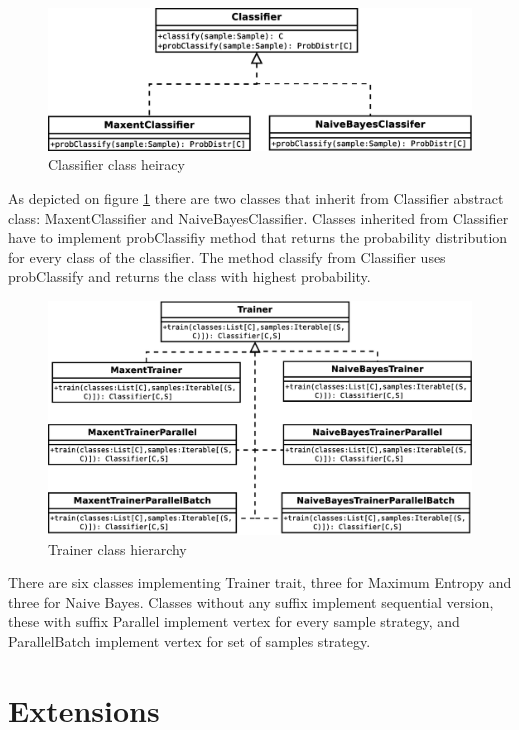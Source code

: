 \documentclass{report}
\begin{document}
\begin{figure}[!htb]
  \centering
  \includegraphics*[scale=0.45]{classes1.eps}
  \caption{Classifier class heiracy}
  \label{fig:classes1}
\end{figure}

As depicted on figure \ref{fig:classes1} there are two classes that inherit from Classifier abstract class: MaxentClassifier and NaiveBayesClassifier. Classes inherited from Classifier have to implement probClassifiy method that returns the probability distribution for every class of the classifier. The method classify from Classifier uses probClassify and returns the class with highest probability.

\begin{figure}[!htb]
  \centering
  \includegraphics*[scale=0.45]{classes2.eps}
  \caption{Trainer class hierarchy}
  \label{fig:classes2}
\end{figure}

There are six classes  implementing Trainer trait, three for Maximum Entropy and three for Naive Bayes. Classes without any suffix implement sequential version, these with suffix Parallel implement vertex for every sample strategy, and ParallelBatch implement vertex for set of samples strategy.

\section{Extensions}
\end{document}
